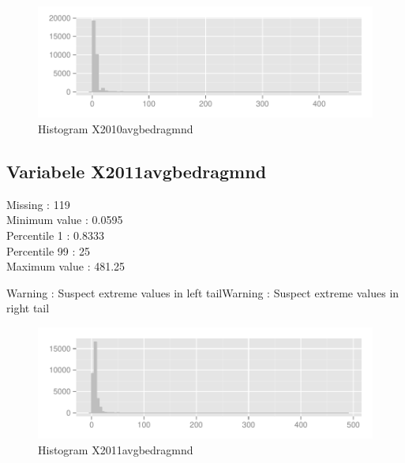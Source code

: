 \documentclass[10pt,a4paper,titlepage]{report}
\begin{document}
\color{black}

\begin{figure}[H]
   \centering
\begin{knitrout}
\color{fgcolor}
\includegraphics[width=\maxwidth]{figure/unnamed-chunk-16} 

\end{knitrout}

    \caption{Histogram X2010avgbedragmnd}
    \label{fig:figPlot8}
\end{figure}


\subsection{Variabele X2011avgbedragmnd}

Missing :  119 \\
Minimum value : 0.0595\\
Percentile 1 : 0.8333\\
Percentile 99 : 25\\
Maximum value : 481.25

\color{red}
Warning : Suspect extreme values in left tailWarning : Suspect extreme values in right tail

\color{black}

\begin{figure}[H]
   \centering
\begin{knitrout}
\color{fgcolor}
\includegraphics[width=\maxwidth]{figure/unnamed-chunk-18} 

\end{knitrout}

    \caption{Histogram X2011avgbedragmnd}
    \label{fig:figPlot9}
\end{figure}
\end{document}
